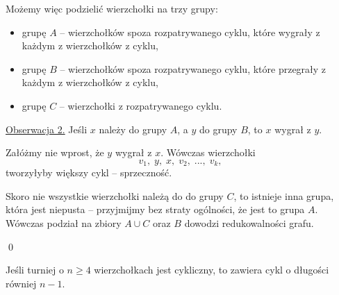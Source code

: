 \vspace{10px}
\noindent
Możemy więc podzielić wierzchołki na trzy grupy:
\begin{itemize}
	\item grupę $A$ -- wierzchołków spoza rozpatrywanego cyklu, które wygrały z każdym z wierzchołków z cyklu,
	\item grupę $B$ -- wierzchołków spoza rozpatrywanego cyklu, które przegrały z każdym z wierzchołków z cyklu,
	\item grupę $C$ -- wierzchołki z rozpatrywanego cyklu.
\end{itemize}

\vspace{10px}
\noindent
\underline{Obserwacja 2.} Jeśli $x$ należy do grupy $A$, a $y$ do grupy $B$, to $x$ wygrał z $y$.

\begin{center}
\end{center}


\vspace{10px}
\noindent
Załóżmy nie wprost, że $y$ wygrał z $x$. Wówczas wierzchołki
\[
	v_1, \; y, \; x, \; v_{2}, \; ..., \; v_k, 
\]
tworzyłyby większy cykl -- sprzeczność.

\vspace{10px}
\noindent
Skoro nie wszystkie wierzchołki należą do do grupy $C$, to istnieje inna grupa, która jest niepusta -- przyjmijmy bez straty ogólności, że jest to grupa $A$. Wówczas podział na zbiory $A \cup C$ oraz $B$ dowodzi redukowalności grafu.

\qed



\noindent
Jeśli turniej o $n \geqslant 4$ wierzchołkach jest cykliczny, to zawiera cykl o długości równiej $n - 1$.

